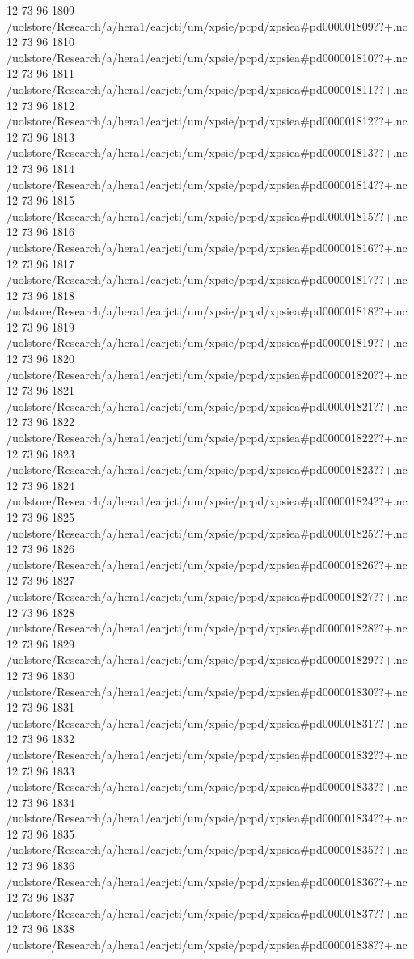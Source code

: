 12 73 96
1809
/uolstore/Research/a/hera1/earjcti/um/xpsie/pcpd/xpsiea#pd000001809??+.nc
12 73 96
1810
/uolstore/Research/a/hera1/earjcti/um/xpsie/pcpd/xpsiea#pd000001810??+.nc
12 73 96
1811
/uolstore/Research/a/hera1/earjcti/um/xpsie/pcpd/xpsiea#pd000001811??+.nc
12 73 96
1812
/uolstore/Research/a/hera1/earjcti/um/xpsie/pcpd/xpsiea#pd000001812??+.nc
12 73 96
1813
/uolstore/Research/a/hera1/earjcti/um/xpsie/pcpd/xpsiea#pd000001813??+.nc
12 73 96
1814
/uolstore/Research/a/hera1/earjcti/um/xpsie/pcpd/xpsiea#pd000001814??+.nc
12 73 96
1815
/uolstore/Research/a/hera1/earjcti/um/xpsie/pcpd/xpsiea#pd000001815??+.nc
12 73 96
1816
/uolstore/Research/a/hera1/earjcti/um/xpsie/pcpd/xpsiea#pd000001816??+.nc
12 73 96
1817
/uolstore/Research/a/hera1/earjcti/um/xpsie/pcpd/xpsiea#pd000001817??+.nc
12 73 96
1818
/uolstore/Research/a/hera1/earjcti/um/xpsie/pcpd/xpsiea#pd000001818??+.nc
12 73 96
1819
/uolstore/Research/a/hera1/earjcti/um/xpsie/pcpd/xpsiea#pd000001819??+.nc
12 73 96
1820
/uolstore/Research/a/hera1/earjcti/um/xpsie/pcpd/xpsiea#pd000001820??+.nc
12 73 96
1821
/uolstore/Research/a/hera1/earjcti/um/xpsie/pcpd/xpsiea#pd000001821??+.nc
12 73 96
1822
/uolstore/Research/a/hera1/earjcti/um/xpsie/pcpd/xpsiea#pd000001822??+.nc
12 73 96
1823
/uolstore/Research/a/hera1/earjcti/um/xpsie/pcpd/xpsiea#pd000001823??+.nc
12 73 96
1824
/uolstore/Research/a/hera1/earjcti/um/xpsie/pcpd/xpsiea#pd000001824??+.nc
12 73 96
1825
/uolstore/Research/a/hera1/earjcti/um/xpsie/pcpd/xpsiea#pd000001825??+.nc
12 73 96
1826
/uolstore/Research/a/hera1/earjcti/um/xpsie/pcpd/xpsiea#pd000001826??+.nc
12 73 96
1827
/uolstore/Research/a/hera1/earjcti/um/xpsie/pcpd/xpsiea#pd000001827??+.nc
12 73 96
1828
/uolstore/Research/a/hera1/earjcti/um/xpsie/pcpd/xpsiea#pd000001828??+.nc
12 73 96
1829
/uolstore/Research/a/hera1/earjcti/um/xpsie/pcpd/xpsiea#pd000001829??+.nc
12 73 96
1830
/uolstore/Research/a/hera1/earjcti/um/xpsie/pcpd/xpsiea#pd000001830??+.nc
12 73 96
1831
/uolstore/Research/a/hera1/earjcti/um/xpsie/pcpd/xpsiea#pd000001831??+.nc
12 73 96
1832
/uolstore/Research/a/hera1/earjcti/um/xpsie/pcpd/xpsiea#pd000001832??+.nc
12 73 96
1833
/uolstore/Research/a/hera1/earjcti/um/xpsie/pcpd/xpsiea#pd000001833??+.nc
12 73 96
1834
/uolstore/Research/a/hera1/earjcti/um/xpsie/pcpd/xpsiea#pd000001834??+.nc
12 73 96
1835
/uolstore/Research/a/hera1/earjcti/um/xpsie/pcpd/xpsiea#pd000001835??+.nc
12 73 96
1836
/uolstore/Research/a/hera1/earjcti/um/xpsie/pcpd/xpsiea#pd000001836??+.nc
12 73 96
1837
/uolstore/Research/a/hera1/earjcti/um/xpsie/pcpd/xpsiea#pd000001837??+.nc
12 73 96
1838
/uolstore/Research/a/hera1/earjcti/um/xpsie/pcpd/xpsiea#pd000001838??+.nc
